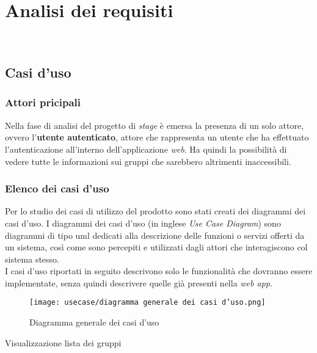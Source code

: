 
\chapter{Analisi dei requisiti}
\label{cap:analisi-requisiti}

\\

\section{Casi d'uso}
\subsection*{Attori pricipali}
Nella fase di analisi del progetto di \textit{stage} è emersa la presenza di un solo attore, ovvero l'\textbf{utente autenticato}, 
attore che rappresenta un utente che ha effettuato l'autenticazione
all'interno dell'applicazione \textit{web}. Ha quindi la possibilità di vedere tutte le informazioni sui gruppi che sarebbero altrimenti inaccessibili. 

\subsection*{Elenco dei casi d'uso}
Per lo studio dei casi di utilizzo del prodotto sono stati creati dei diagrammi dei casi d'uso.
I diagrammi dei casi d'uso (in inglese \emph{Use Case Diagram}) sono diagrammi di tipo \gls{uml} dedicati alla descrizione delle funzioni o servizi offerti da un sistema, così come sono percepiti e utilizzati dagli attori che interagiscono col sistema stesso.\\
I casi d'uso riportati in seguito descrivono solo le funzionalità che dovranno essere implementate, senza quindi descrivere quelle già presenti nella \textit{web app}. 
\begin{figure}[H] 
    \centering 
    \texttt{[image: usecase/diagramma generale dei casi d'uso.png]} 
    \caption{Diagramma generale dei casi d'uso}
\end{figure}

\begin{usecase}{Visualizzazione lista dei gruppi}
    \label{uc:scenario-visualizzazione-lista-gruppi}
    
\end{usecase}
\newpage

